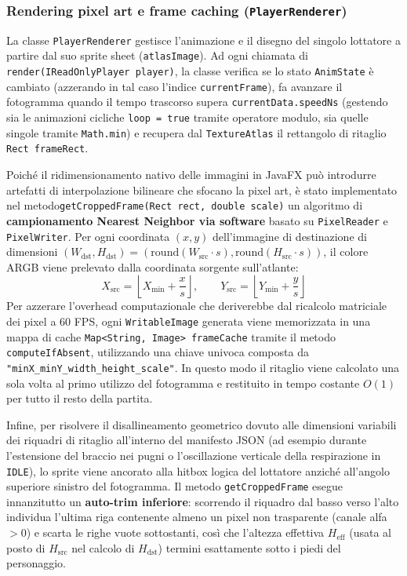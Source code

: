 \documentclass[11pt, a4paper]{article}
\begin{document}
	\subsubsection{Rendering pixel art e frame caching (\texttt{PlayerRenderer})}
	La classe \texttt{PlayerRenderer} gestisce l'animazione e il disegno del singolo lottatore a partire dal suo sprite sheet (\texttt{atlasImage}). Ad ogni chiamata di \texttt{render(IReadOnlyPlayer player)}, la classe verifica se lo stato \texttt{AnimState} è cambiato (azzerando in tal caso l'indice \texttt{currentFrame}), fa avanzare il fotogramma quando il tempo trascorso supera \texttt{currentData.speedNs} (gestendo sia le animazioni cicliche \texttt{loop = true} tramite operatore modulo, sia quelle singole tramite \texttt{Math.min}) e recupera dal \texttt{TextureAtlas} il rettangolo di ritaglio \texttt{Rect frameRect}.
	
	Poiché il ridimensionamento nativo delle immagini in JavaFX può introdurre artefatti di interpolazione bilineare che sfocano la pixel art, è stato implementato nel metodo\newline\texttt{getCroppedFrame(Rect rect, double scale)} un algoritmo di \textbf{campionamento Nearest Neighbor via software} basato su \texttt{PixelReader} e \texttt{PixelWriter}. Per ogni coordinata $(x, y)$ dell'immagine di destinazione di dimensioni $(W_{\text{dst}}, H_{\text{dst}}) = (\text{round}(W_{\text{src}} \cdot s), \text{round}(H_{\text{src}} \cdot s))$, il colore ARGB viene prelevato dalla coordinata sorgente sull'atlante:
	\begin{equation}
		X_{\text{src}} = \left\lfloor X_{\min} + \frac{x}{s} \right\rfloor, \qquad Y_{\text{src}} = \left\lfloor Y_{\min} + \frac{y}{s} \right\rfloor
	\end{equation}
	Per azzerare l'overhead computazionale che deriverebbe dal ricalcolo matriciale dei pixel a 60 FPS, ogni \texttt{WritableImage} generata viene memorizzata in una mappa di cache \texttt{Map<String, Image> frameCache} tramite il metodo \texttt{computeIfAbsent}, utilizzando una chiave univoca composta da \texttt{"minX\_minY\_width\_height\_scale"}. In questo modo il ritaglio viene calcolato una sola volta al primo utilizzo del fotogramma e restituito in tempo costante $O(1)$ per tutto il resto della partita.
	
	Infine, per risolvere il disallineamento geometrico dovuto alle dimensioni variabili dei riquadri di ritaglio all'interno del manifesto JSON (ad esempio durante l'estensione del braccio nei pugni o l'oscillazione verticale della respirazione in \texttt{IDLE}), lo sprite viene ancorato alla hitbox logica del lottatore anziché all'angolo superiore sinistro del fotogramma. Il metodo \texttt{getCroppedFrame} esegue innanzitutto un \textbf{auto-trim inferiore}: scorrendo il riquadro dal basso verso l'alto individua l'ultima riga contenente almeno un pixel non trasparente (canale alfa $> 0$) e scarta le righe vuote sottostanti, così che l'altezza effettiva $H_{\text{eff}}$ (usata al posto di $H_{\text{src}}$ nel calcolo di $H_{\text{dst}}$) termini esattamente sotto i piedi del personaggio.
\end{document}

